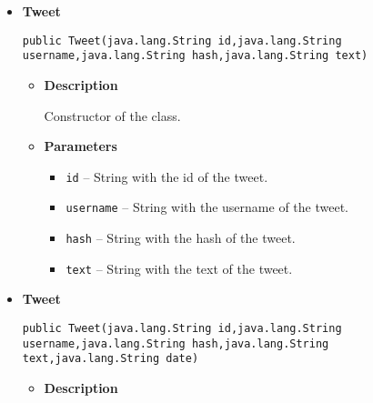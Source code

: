 {{{{{{{{\begin{itemize}
{\begin{itemize}
{Constructor of the class.
}
\item{
{\bf  Parameters}
  \begin{itemize}
   \item{
\texttt{tweetStatus} -- Status from the object of Twitter4j.}
  \end{itemize}
}%
\end{itemize}
}%
\item{ 
\hypertarget{com.jmorenov.tweetsccore.twitter.Tweet(java.lang.String, java.lang.String, java.lang.String, java.lang.String)}{{\bf  Tweet}\\}
\begin{lstlisting}[frame=none]
public Tweet(java.lang.String id,java.lang.String username,java.lang.String hash,java.lang.String text)\end{lstlisting} %
\begin{itemize}
\item{
{\bf  Description}

Constructor of the class.
}
\item{
{\bf  Parameters}
  \begin{itemize}
   \item{
\texttt{id} -- String with the id of the tweet.}
   \item{
\texttt{username} -- String with the username of the tweet.}
   \item{
\texttt{hash} -- String with the hash of the tweet.}
   \item{
\texttt{text} -- String with the text of the tweet.}
  \end{itemize}
}%
\end{itemize}
}%
\item{ 
\hypertarget{com.jmorenov.tweetsccore.twitter.Tweet(java.lang.String, java.lang.String, java.lang.String, java.lang.String, java.lang.String)}{{\bf  Tweet}\\}
\begin{lstlisting}[frame=none]
public Tweet(java.lang.String id,java.lang.String username,java.lang.String hash,java.lang.String text,java.lang.String date)\end{lstlisting} %
\begin{itemize}
\item{
{\bf  Description}

}
\end{itemize}}
\end{itemize}}}}}}}}}
